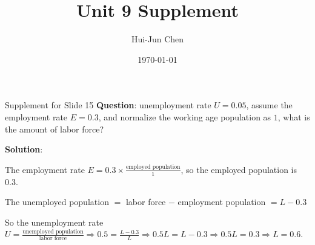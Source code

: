 \documentclass{beamer}
\title{Unit 9 Supplement}
\author{Hui-Jun Chen}
\institute{The Ohio State University}
\date{\today}
\begin{document}
\maketitle



\begin{frame}{Supplement for Slide 15}
\label{slide:Supplement_for_Slide_15}
    \textbf{Question}: unemployment rate $ U = 0.05 $, assume the employment rate $ E = 0.3 $, and normalize the working age population as $ 1 $, what is the amount of labor force?

    \textbf{Solution}:

    The employment rate $ E = 0.3 \times \frac{\text{employed population}}{1}  $, so the employed population is $ 0.3 $.

    The unemployed population $ =  $ labor force $ - $ employment population $ = L - 0.3 $

    So the unemployment rate $ U = \frac{\text{unemployed population}}{\text{labor force}} \Rightarrow  0.5 = \frac{L - 0.3}{L} \Rightarrow 0.5L = L - 0.3 \Rightarrow 0.5L = 0.3 \Rightarrow L = 0.6 $.

\end{frame}




\printbibliography[heading=none]
\end{document}
